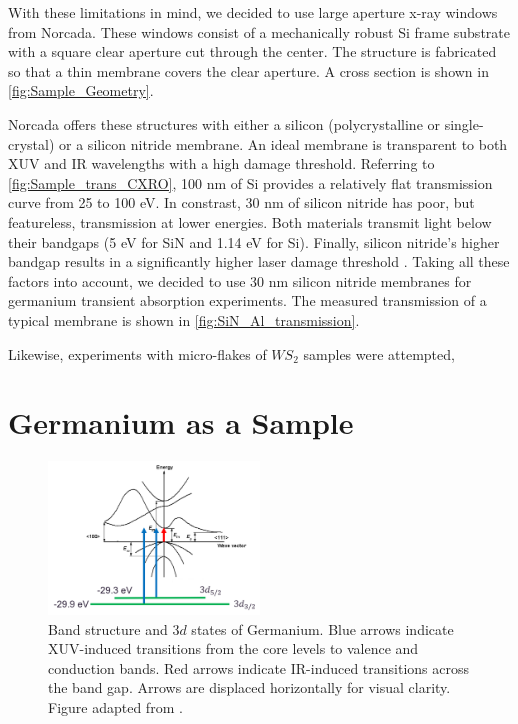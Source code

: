 With these limitations in mind, we decided to use large aperture x-ray windows from Norcada. These windows consist of a mechanically robust Si frame substrate with a square clear aperture cut through the center. The structure is fabricated so that a thin membrane covers the clear aperture. A cross section is shown in \cref{fig:Sample_Geometry}.

Norcada offers these structures with either a silicon (polycrystalline or single-crystal) or a silicon nitride membrane. An ideal membrane is transparent to both XUV and IR wavelengths with a high damage threshold. Referring to \cref{fig:Sample_trans_CXRO}, 100 nm of Si provides a relatively flat transmission curve from 25 to 100 eV. In constrast, 30 nm of silicon nitride has poor, but featureless, transmission at lower energies. Both materials transmit light below their bandgaps (5 eV for SiN and 1.14 eV for Si). Finally, silicon nitride's higher bandgap results in a significantly higher laser damage threshold \cite{gamalyAblationSolidsFemtosecond2002, austinFemtosecondLaserDamage2018, keldyshIonizationFieldStrong1965}. Taking all these factors into account, we decided to use 30 nm silicon nitride membranes for germanium transient absorption experiments. The measured transmission of a typical membrane is shown in \cref{fig:SiN_Al_transmission}.

Likewise, experiments with micro-flakes of $WS_2$ samples were attempted, 



\section{Germanium as a Sample}

\begin{figure}
	\centering
	\includegraphics[width=0.5\textwidth]{figures/chap3/Ge_band_diagram.png}
	\caption{Band structure and $3d$ states of Germanium. Blue arrows indicate XUV-induced transitions from the core levels to valence and conduction bands. Red arrows indicate IR-induced transitions across the band gap. Arrows are displaced horizontally for visual clarity. Figure adapted from \cite{NSMArchivePhysical}.}
	\label{fig:Ge_band_diagram}
\end{figure}

